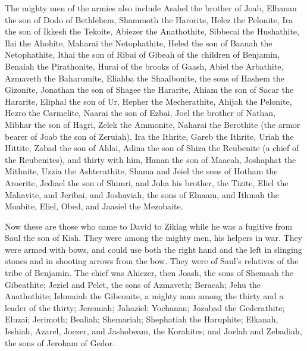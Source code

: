 \myverse{}The mighty men of the armies also include Asahel the brother
of Joab, Elhanan the son of Dodo of Bethlehem,
\myverse{}Shammoth the Harorite, Helez the Pelonite,
\myverse{}Ira the son of Ikkesh the Tekoite, Abiezer the Anathothite,
\myverse{}Sibbecai the Hushathite, Ilai the Ahohite,
\myverse{}Maharai the Netophathite, Heled the son of Baanah the Netophathite,
\myverse{}Ithai the son of Ribai of Gibeah of the children of Benjamin, Benaiah the
Pirathonite,
\myverse{}Hurai of the brooks of Gaash, Abiel the Arbathite,
\myverse{}Azmaveth the Baharumite, Eliahba the Shaalbonite,
\myverse{}the sons of Hashem the Gizonite, Jonathan the son of Shagee the Hararite,
\myverse{}Ahiam the son of Sacar the Hararite, Eliphal the son of Ur,
\myverse{}Hepher the Mecherathite, Ahijah the Pelonite,
\myverse{}Hezro the Carmelite, Naarai the son of Ezbai,
\myverse{}Joel the brother of Nathan, Mibhar the son of Hagri,
\myverse{}Zelek the Ammonite, Naharai the Berothite (the armor bearer of Joab the son
of Zeruiah),
\myverse{}Ira the Ithrite, Gareb the Ithrite,
\myverse{}Uriah the Hittite, Zabad the son of Ahlai,
\myverse{}Adina the son of Shiza the Reubenite (a chief of the Reubenites), and thirty
with him,
\myverse{}Hanan the son of Maacah, Joshaphat the Mithnite,
\myverse{}Uzzia the Ashterathite, Shama and Jeiel the sons of Hotham the Aroerite,
\myverse{}Jediael the son of Shimri, and Joha his brother, the Tizite,
\myverse{}Eliel the Mahavite, and Jeribai, and Joshaviah, the sons of Elnaam, and Ithmah
the Moabite,
\myverse{}Eliel, Obed, and Jaasiel the Mezobaite.


\mychapter{} \myverse*{}Now these are those who came to David to Ziklag while he was a
fugitive from Saul the son of Kish. They were among the mighty men, his helpers in war.
\myverse{}They were armed with bows, and could use both the right hand and the left in
slinging stones and in shooting arrows from the bow. They were of Saul’s relatives of the tribe of Benjamin.
\myverse{}The chief was Ahiezer, then Joash, the sons of Shemaah the Gibeathite; Jeziel
and Pelet, the sons of Azmaveth; Beracah; Jehu the Anathothite;
\myverse{}Ishmaiah the Gibeonite, a mighty man among the thirty and a leader of the thirty;
Jeremiah; Jahaziel; Yochanan; Jozabad the Gederathite;
\myverse{}Eluzai; Jerimoth; Bealiah; Shemariah; Shephatiah the Haruphite;
\myverse{}Elkanah, Isshiah, Azarel, Joezer, and Jashobeam, the Korahites;
\myverse{}and Joelah and Zebadiah, the sons of Jeroham of Gedor.

